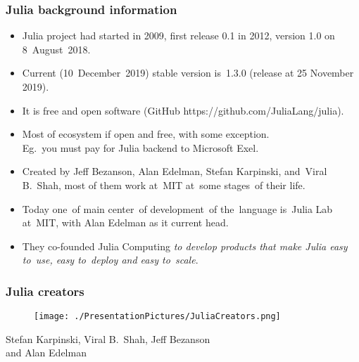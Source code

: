 \documentclass[10pt,t]{beamer}
\begin{document}
\begin{frame}
  \frametitle{Julia background information}


  \begin{itemize}

  \item Julia project had started in 2009, first release 0.1 in 2012,
    version 1.0 on 8~August~2018.

  \item Current (10~December~2019) stable version is~1.3.0 (release at 25
    November 2019).

  \item It is \alert{free} and \alert{open software} (GitHub
    {https://github.com/JuliaLang/julia}).

  \item Most of ecosystem if open and free, with \alert{some}
    exception. \\
    Eg.~you must pay for Julia backend to Microsoft Exel.

  \item Created by Jeff Bezanson, Alan Edelman, Stefan Karpinski,
    and~Viral B.~Shah, most of them work at~MIT at~some stages~of
    their life.

  \item Today one~of main center~of development~of the~language
    is~Julia Lab at~MIT, with Alan Edelman as it current head.

  \item They co-founded Julia Computing \textit{to develop products that
      make Julia easy to~use, easy to~deploy and easy to~scale}.

  \end{itemize}

\end{frame}





\begin{frame}
  \frametitle{Julia creators}


  \begin{figure}

    \centering

    \texttt{[image: ./PresentationPictures/JuliaCreators.png]}

  \end{figure}


  \begin{center}

    Stefan Karpinski, Viral B.~Shah, Jeff Bezanson \\
    \hspace{-12em} and Alan Edelman

  \end{center}

\end{frame}
\end{document}
